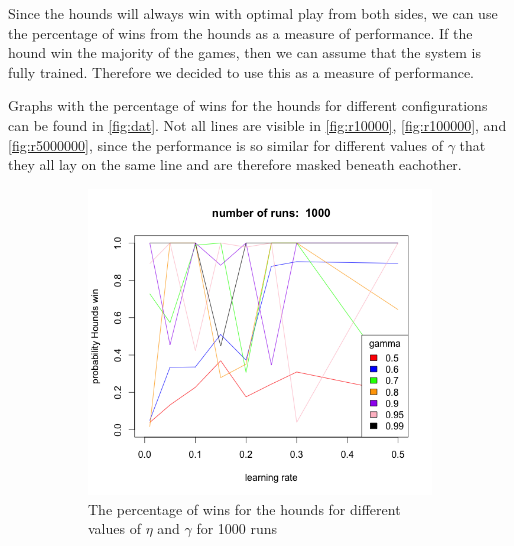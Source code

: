 Since the hounds will always win with optimal play from both sides, we can
use the percentage of wins from the hounds as a measure of performance. If
the hound win the majority of the games, then we can assume that the system is
fully trained. Therefore we decided to use this as a measure of performance. 

Graphs with the percentage of wins for the hounds for different
configurations can be found in \autoref{fig:dat}. Not all lines are visible
in \autoref{fig:r10000}, \autoref{fig:r100000}, and \autoref{fig:r5000000},
since the performance is so similar for different values of $\gamma$ that
they all lay on the same line and are therefore masked beneath eachother.

\begin{figure}[bt]
    \centering
    \begin{subfigure}{0.49\textwidth}
        \includegraphics[width=\textwidth]{r1000}
        \caption{The percentage of wins for the hounds for different values
            of $\eta$ and $\gamma$ for 1000 runs}
        \label{fig:r1000}
    \end{subfigure}
    ~
    \begin{subfigure}{0.49\textwidth}

\end{subfigure}
\end{figure}
